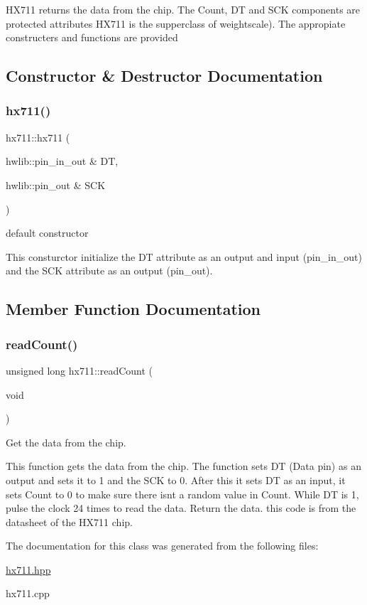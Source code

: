 H\+X711 returns the data from the chip. The Count, DT and S\+CK components are protected attributes H\+X711 is the supperclass of weightscale). The appropiate constructers and functions are provided 

\subsection{Constructor \& Destructor Documentation}
\mbox{\label{classhx711_a3676f13c54b3a63e36390fe48eb24b91}} 
\subsubsection{\texorpdfstring{hx711()}{hx711()}}
{\footnotesize\ttfamily hx711\+::hx711 (\begin{DoxyParamCaption}\item[{hwlib\+::pin\+\_\+in\+\_\+out \&}]{DT,  }\item[{hwlib\+::pin\+\_\+out \&}]{S\+CK }\end{DoxyParamCaption})}



default constructor 

This consturctor initialize the DT attribute as an output and input (pin\+\_\+in\+\_\+out) and the S\+CK attribute as an output (pin\+\_\+out). 

\subsection{Member Function Documentation}
\mbox{\label{classhx711_ad1d55443d9cd3d4250c48a7fcd2fac09}} 
\subsubsection{\texorpdfstring{read\+Count()}{readCount()}}
{\footnotesize\ttfamily unsigned long hx711\+::read\+Count (\begin{DoxyParamCaption}\item[{void}]{ }\end{DoxyParamCaption})}



Get the data from the chip. 

This function gets the data from the chip. The function sets DT (Data pin) as an output and sets it to 1 and the S\+CK to 0. After this it sets DT as an input, it sets Count to 0 to make sure there isn\textquotesingle{}t a random value in Count. While DT is 1, pulse the clock 24 times to read the data. Return the data. this code is from the datasheet of the H\+X711 chip. 

The documentation for this class was generated from the following files\+:\begin{DoxyCompactItemize}
\item 
\hyperlink{hx711_8hpp}{hx711.\+hpp}\item 
hx711.\+cpp\end{DoxyCompactItemize}
